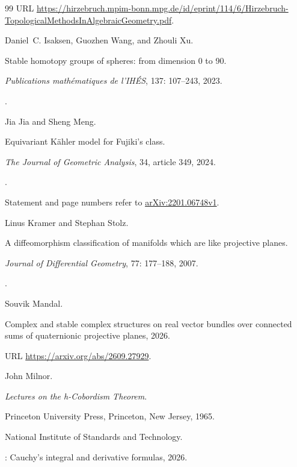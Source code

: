 \documentclass[11pt,a4paper]{article}
\numberwithin{equation}{section}
\theoremstyle{definition}
\begin{document}
\begin{thebibliography}{99}
\newblock URL
  \url{https://hirzebruch.mpim-bonn.mpg.de/id/eprint/114/6/Hirzebruch-TopologicalMethodsInAlgebraicGeometry.pdf}.

Daniel~C. Isaksen, Guozhen Wang, and Zhouli Xu.

\newblock Stable homotopy groups of spheres: from dimension 0 to 90.

\newblock \emph{Publications mathématiques de l'IHÉS}, 137:
  107--243, 2023.

\newblock {}.

Jia Jia and Sheng Meng.

\newblock Equivariant K{\"a}hler model for Fujiki's class.

\newblock \emph{The Journal of Geometric Analysis}, 34, article 349, 2024.

\newblock {}.

\newblock Statement and page numbers refer to
\href{https://arxiv.org/pdf/2201.06748v1}{arXiv:2201.06748v1}.

Linus Kramer and Stephan Stolz.

\newblock A diffeomorphism classification of manifolds which are like
  projective planes.

\newblock \emph{Journal of Differential Geometry}, 77: 177--188, 2007.

\newblock {}.

Souvik Mandal.

\newblock Complex and stable complex structures on real vector bundles over
  connected sums of quaternionic projective planes, 2026.

\newblock URL \url{https://arxiv.org/abs/2609.27929}.

John Milnor.

\newblock \emph{Lectures on the h-Cobordism Theorem}.

\newblock Princeton University Press, Princeton, New Jersey,
  1965.

{National Institute of Standards and Technology}.

: Cauchy's integral and
  derivative formulas, 2026.


\end{thebibliography}
\end{document}
